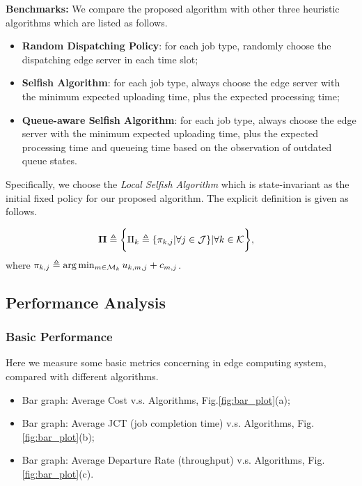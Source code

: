 \textbf{Benchmarks:}
We compare the proposed algorithm with other three heuristic algorithms which are listed as follows.
\begin{itemize}
    \item \textbf{Random Dispatching Policy}:
            for each job type, randomly choose the dispatching edge server in each time slot; 
    \item \textbf{Selfish Algorithm}:
            for each job type, always choose the edge server with the minimum expected uploading time, plus the expected processing time;
    \item \textbf{Queue-aware Selfish Algorithm}:
            for each job type, always choose the edge server with the minimum expected uploading time, plus the expected processing time and queueing time based on the observation of outdated queue states.
\end{itemize}
Specifically, we choose the \emph{Local Selfish Algorithm} which is state-invariant as the initial fixed policy for our proposed algorithm.
The explicit definition is given as follows.
\begin{policy}
    \begin{align}
        \boldsymbol{\Pi} &\triangleq \bigg\{ \Pi_{k}\triangleq\{\pi_{k,j}|\forall j\in\mathcal{J}\} |\forall k\in\mathcal{K} \bigg\},
    \end{align}
    where $\pi_{k,j} \triangleq \arg\min_{m\in\mathcal{M}_{k}} u_{k,m,j} + c_{m,j}$.
\end{policy}

\subsection{Performance Analysis}
    \subsubsection{Basic Performance}
    Here we measure some basic metrics concerning in edge computing system, compared with different algorithms.
    \begin{itemize}
        \item Bar graph: Average Cost v.s. Algorithms, Fig.\ref{fig:bar_plot}(a);
        \item Bar graph: Average JCT (job completion time) v.s. Algorithms, Fig.\ref{fig:bar_plot}(b); %
        \item Bar graph: Average Departure Rate (throughput) v.s. Algorithms, Fig.\ref{fig:bar_plot}(c). 
    \end{itemize}

